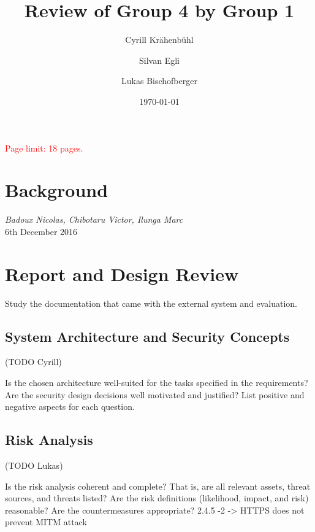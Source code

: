 \documentclass[english]{article}
\title{\huge\sffamily\bfseries Review of Group 4 by Group 1}
\author{Cyrill Kr\"ahenb\"uhl \and Silvan Egli \and Lukas Bischofberger}
\date{\today}
\begin{document}
\maketitle

\begin{center}
{\large\textcolor{red}{Page limit: 18 pages.}}
\end{center}

\tableofcontents
\pagebreak



\section{Background}

 {\it Badoux Nicolas, Chibotaru Victor, Ilunga Marc} \\

 6th December 2016


\section{Report and Design Review}

Study the documentation that came with the external system and evaluation. 

\subsection{System Architecture and Security Concepts} (TODO Cyrill)

Is the chosen architecture well-suited for the tasks specified in the requirements? Are the security design decisions well motivated and justified? List positive and negative aspects for each question.


\subsection{Risk Analysis} (TODO Lukas)

Is the risk analysis coherent and complete? That is, are all relevant assets, threat sources, and threats listed? 
%
Are the risk definitions (likelihood, impact, and risk) reasonable?
%
Are the countermeasures appropriate?
2.4.5 -2 -> HTTPS does not prevent MITM attack
\end{document}
